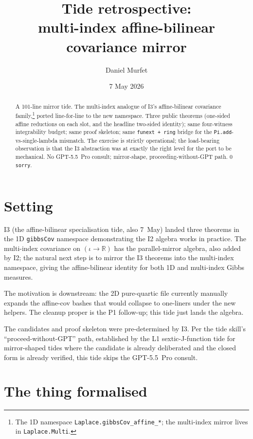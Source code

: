 \documentclass[11pt]{article}
\title{Tide retrospective:\\multi-index affine-bilinear covariance mirror}
\author{Daniel Murfet}
\date{7 May 2026}
\begin{document}
\maketitle

\begin{abstract}
A 101-line mirror tide. The multi-index analogue of I3's affine-bilinear
covariance family,\footnote{The 1D namespace
\texttt{Laplace.gibbsCov\_affine\_*}; the multi-index mirror lives in
\texttt{Laplace.Multi}.} ported line-for-line to the new namespace.
Three public theorems (one-sided affine reductions on each slot, and
the headline two-sided identity); same four-witness integrability
budget; same proof skeleton; same \texttt{funext + ring} bridge for
the \texttt{Pi.add}-vs-single-lambda mismatch. The exercise is strictly
operational; the load-bearing observation is that the I3 abstraction
was at exactly the right level for the port to be mechanical. No
GPT-5.5~Pro consult; mirror-shape, proceeding-without-GPT path. 0
\texttt{sorry}.
\end{abstract}

\section{Setting}

I3 (the affine-bilinear specialisation tide, also 7~May) landed
three theorems in the 1D \texttt{gibbsCov} namespace demonstrating
the I2 algebra works in practice. The multi-index covariance on
$(\iota \to \mathbb{R})$ has the parallel-mirror algebra, also added
by I2; the natural next step is to mirror the I3 theorems into the
multi-index namespace, giving the affine-bilinear identity for both
1D and multi-index Gibbs measures.

The motivation is downstream: the 2D pure-quartic file currently
manually expands the affine-cov bashes that would collapse to
one-liners under the new helpers. The cleanup proper is the P1
follow-up; this tide just lands the algebra.

The candidates and proof skeleton were pre-determined by I3. Per the
tide skill's ``proceed-without-GPT'' path, established by the L1
sextic-J-function tide for mirror-shaped tides where the candidate is
already deliberated and the closed form is already verified, this
tide skips the GPT-5.5~Pro consult.

\section{The thing formalised}
\end{document}
